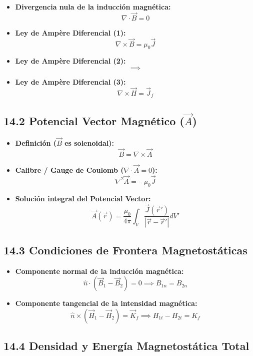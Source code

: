 \documentclass[11pt,a4paper]{article}
\begin{document}
\begin{itemize}
  \item \textbf{Divergencia nula de la inducción magnética:}
  \[
    \nabla \cdot \vec{B} = 0
  \]
  \item \textbf{Ley de Ampère Diferencial (1):}
  \[
    \nabla \times \vec{B} = \mu_0 \vec{J}
  \]
  \item \textbf{Ley de Ampère Diferencial (2):}
  \[
    \implies
  \]
  \item \textbf{Ley de Ampère Diferencial (3):}
  \[
    \nabla \times \vec{H} = \vec{J}_f
  \]
\end{itemize}

\subsection*{14.2 Potencial Vector Magnético ($\vec{A}$)}

\begin{itemize}
  \item \textbf{Definición ($\vec{B}$ es solenoidal):}
  \[
    \vec{B} = \nabla \times \vec{A}
  \]
  \item \textbf{Calibre / Gauge de Coulomb ($\nabla \cdot \vec{A} = 0$):}
  \[
    \nabla^2 \vec{A} = -\mu_0 \vec{J}
  \]
  \item \textbf{Solución integral del Potencial Vector:}
  \[
    \vec{A}(\vec{r}) = \frac{\mu_0}{4\pi} \int_V \frac{\vec{J}(\vec{r}')}{|\vec{r} - \vec{r}'|} dV'
  \]
\end{itemize}

\subsection*{14.3 Condiciones de Frontera Magnetostáticas}

\begin{itemize}
  \item \textbf{Componente normal de la inducción magnética:}
  \[
    \hat{n} \cdot (\vec{B}_1 - \vec{B}_2) = 0 \implies B_{1n} = B_{2n}
  \]
  \item \textbf{Componente tangencial de la intensidad magnética:}
  \[
    \hat{n} \times (\vec{H}_1 - \vec{H}_2) = \vec{K}_f \implies H_{1t} - H_{2t} = K_f
  \]
\end{itemize}

\subsection*{14.4 Densidad y Energía Magnetostática Total}
\end{document}
